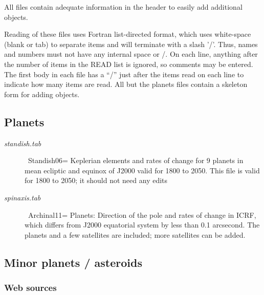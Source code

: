 \documentclass[draft]{article}  %
\newcommand{\qcite}[1]{#1=\cite{#1}}  %
\begin{document}
All files contain adequate information in the header to easily add additional objects.

Reading of these files uses Fortran list-directed format, which uses white-space (blank or tab)
to separate items and will terminate with a slash '/'. Thus, names and numbers
must not have any internal space or /.  On each line, anything after the number
of items in the READ list is ignored, so comments may be entered. The first body in each file has a ``/'' just after the items read on each line to indicate how many items are read. All but the planets files contain a skeleton form for adding objects.

\subsection{Planets} 

\begin{description} 
 \item [\textit{standish.tab}] \ \qcite{Standish06} Keplerian elements and rates of change for 9 planets in mean ecliptic and equinox of J2000 valid for 1800 to 2050.
This file is valid for 1800 to 2050; it should not need any edits

 \item [\textit{spinaxis.tab}] \ \qcite{Archinal11} Planets: Direction of the pole and rates of change in ICRF, which differs from J2000 equatorial system by less than 0.1 arcsecond. The planets and a few satellites are included; more satellites can be added.
\end{description}

\subsection{Minor planets / asteroids }


\subsubsection{Web sources} %
\end{document}
